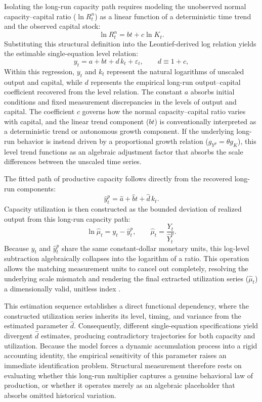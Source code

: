 \documentclass[11pt]{article}
\begin{document}
Isolating the long-run capacity path requires modeling the unobserved normal capacity--capital ratio ($\ln R^n_t$) as a linear function of a deterministic time trend and the observed capital stock:
\begin{equation}
\ln R^n_t = bt + c \ln K_t.
\end{equation}
Substituting this structural definition into the Leontief-derived log relation yields the estimable single-equation level relation:
\begin{equation}
\label{eq:shaikh_regression}
y_t = a + bt + d\,k_t + \varepsilon_t,
\qquad d \equiv 1+c,
\end{equation}
Within this regression, $y_t$ and $k_t$ represent the natural logarithms of unscaled output and capital, while $d$ represents the empirical long-run output--capital coefficient recovered from the level relation. The constant $a$ absorbs initial conditions and fixed measurement discrepancies in the levels of output and capital. The coefficient $c$ governs how the normal capacity--capital ratio varies with capital, and the linear trend component ($bt$) is conventionally interpreted as a deterministic trend or autonomous growth component. If the underlying long-run behavior is instead driven by a proportional growth relation ($g_{Y^p} = \theta g_K$), this level trend functions as an algebraic adjustment factor that absorbs the scale differences between the unscaled time series.

The fitted path of productive capacity follows directly from the recovered long-run components:
\begin{equation}
\label{eq:fitted_capacity}
\hat{y}^p_t = \hat{a} + \hat{b}t + \hat{d}\,k_t.
\end{equation}
Capacity utilization is then constructed as the bounded deviation of realized output from this long-run capacity path:
\begin{equation}
\label{eq:constructed_utilization}
\ln \hat{\mu}_t = y_t - \hat{y}^p_t,
\qquad
\hat{\mu}_t = \frac{Y_t}{\hat{Y}^p_t}.
\end{equation}
Because $y_t$ and $\hat{y}^p_t$ share the same constant-dollar monetary units, this log-level subtraction algebraically collapses into the logarithm of a ratio. This operation allows the matching measurement units to cancel out completely, resolving the underlying scale mismatch and rendering the final extracted utilization series ($\hat{\mu}_t$) a dimensionally valid, unitless index \citep{Basu2022dimensional}.

This estimation sequence establishes a direct functional dependency, where the constructed utilization series inherits its level, timing, and variance from the estimated parameter $\hat{d}$. Consequently, different single-equation specifications yield divergent $\hat{d}$ estimates, producing contradictory trajectories for both capacity and utilization. Because the model forces a dynamic accumulation process into a rigid accounting identity, the empirical sensitivity of this parameter raises an immediate identification problem. Structural measurement therefore rests on evaluating whether this long-run multiplier captures a genuine behavioral law of production, or whether it operates merely as an algebraic placeholder that absorbs omitted historical variation.
\end{document}
